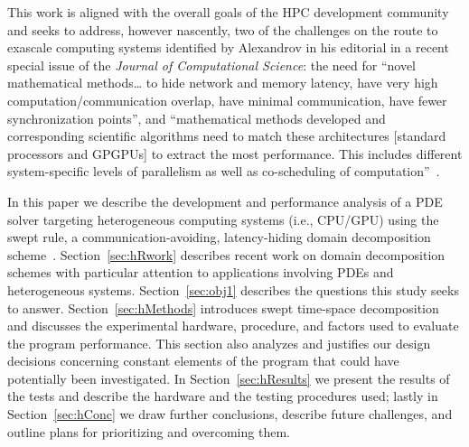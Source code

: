 This work is aligned with the overall goals of the HPC development community and seeks to address, however nascently, two of the challenges on the route to exascale computing systems identified by Alexandrov in his editorial in a recent special issue of the \textit{Journal of Computational Science}: the need for ``novel mathematical methods\dots{} to hide network and memory latency, have very high computation\slash communication overlap, have minimal communication, have fewer synchronization points'', and ``mathematical methods developed and corresponding scientific algorithms need to match these architectures [standard processors and GPGPUs] to extract the most performance. This includes different system-specific levels of parallelism as well as co-scheduling of computation''~\cite{ALEXANDROV20161}.

In this paper we describe the development and performance analysis of a PDE solver targeting heterogeneous computing systems (i.e., CPU\slash GPU) using the swept rule, a communication-avoiding, latency-hiding domain decomposition scheme~\cite{alhubail:16jcp,Alhubail:2016arxiv}.
Section~\ref{sec:hRwork} describes recent work on domain decomposition schemes with particular attention to applications involving PDEs and heterogeneous systems.
Section~\ref{sec:obj1} describes the questions this study seeks to answer.
Section~\ref{sec:hMethods} introduces swept time-space decomposition and discusses the experimental hardware, procedure, and factors used to evaluate the program performance.
This section also analyzes and justifies our design decisions concerning constant elements of the program that could have potentially been investigated.
In Section~\ref{sec:hResults} we present the results of the tests and describe the hardware and the testing procedures used; lastly in Section~\ref{sec:hConc} we draw further conclusions, describe future challenges, and outline plans for prioritizing and overcoming them.
